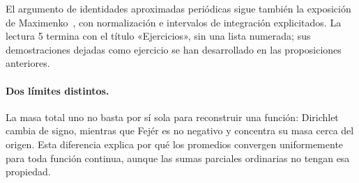 El argumento de identidades aproximadas periódicas sigue también la exposición de Maximenko~\cite{maximenkoPeriodicos}, con normalización e intervalos de integración explicitados. La lectura 5 termina con el título «Ejercicios», sin una lista numerada; sus demostraciones dejadas como ejercicio se han desarrollado en las proposiciones anteriores.

\paragraph{Dos límites distintos.}
La masa total uno no basta por sí sola para reconstruir una función: Dirichlet cambia de signo, mientras que Fejér es no negativo y concentra su masa cerca del origen. Esta diferencia explica por qué los promedios convergen uniformemente para toda función continua, aunque las sumas parciales ordinarias no tengan esa propiedad.
